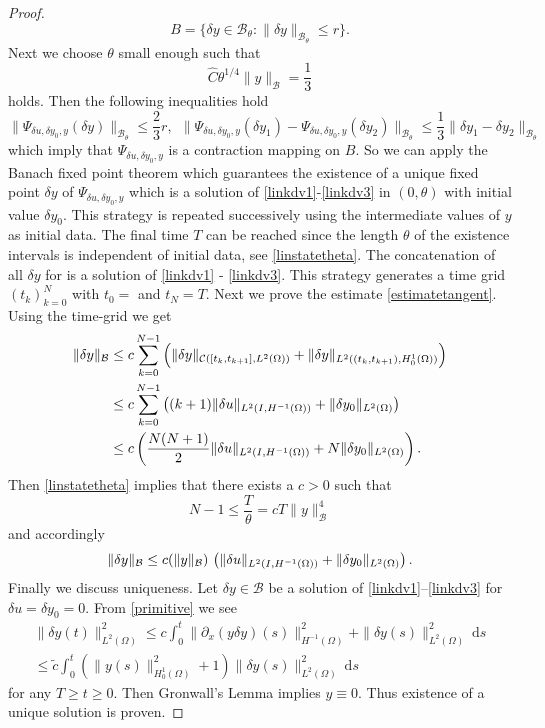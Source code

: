 \begin{proof}
\[
B=\{\delta y \in \mathcal B_{\theta}\colon \|\delta y\|_{\mathcal B_{\theta}}\leq r\}.
\]
{\color{red}
Next we choose $\theta$ small enough such that
\begin{equation}\label{linstatetheta}
\hat C\theta^{1/4}\|y\|_{\mathcal B}=\frac{1}{3}
\end{equation}
holds. Then the following inequalities hold
\[
\|\Psi_{\delta u, \delta y_0,y}(\delta y)\|_{\mathcal B_{\theta}}\leq \frac{2}{3}r,~~\|\Psi_{\delta u, \delta y_0,y}(\delta y_1) - \Psi_{\delta u, \delta y_0,y}(\delta y_2)\|_{\mathcal B_{\theta}}\leq\frac{1}{3}\|\delta y_1-\delta y_2\|_{\mathcal B_{\theta}}
\]
which imply that $\Psi_{\delta u, \delta y_0,y}$ is a contraction mapping on $B$. So we can apply the Banach fixed point theorem which guarantees the existence of a unique fixed point $\delta y$ of $\Psi_{\delta u, \delta y_0,y}$ which is a solution of \eqref{linkdv1}-\eqref{linkdv3} in $(0,\theta)$ with initial value $\delta y_0$. This strategy is repeated successively using the intermediate values of $y$ as initial data. The final time $T$ can be reached since the length $\theta$ of the existence intervals is independent of initial data, see \eqref{linstatetheta}. The concatenation of all $\delta y$ for is a solution of \eqref{linkdv1} - \eqref{linkdv3}. This strategy generates a time grid $(t_k)_{k=0}^N$ with $t_0=$ and $t_N=T$. Next we prove the estimate \eqref{estimatetangent}. Using the time-grid we get
\begin{align*}
\|\delta y\|_{\mathcal B}&\leq c\sum_{k=0}^{N-1}\left(\|\delta y\|_{\mathcal C([t_k,t_{k+1}],L^2(\Omega))}+\|\delta y\|_{L^2((t_k,t_{k+1}),H^1_0(\Omega))}\right)\\
&\leq c\sum_{k=0}^{N-1}\left((k+1)\|\delta u\|_{\Hm1}+\|\delta y_0\|_{L^2(\Omega)}\right)\\
&\leq c\left(\frac{N(N+1)}{2}\|\delta u\|_{\Hm1}+N\|\delta y_0\|_{L^2(\Omega)}\right).
\end{align*}
Then \eqref{linstatetheta} implies that there exists a $c>0$ such that
\[
N-1\leq\frac T\theta=cT\|y\|_{\mathcal B}^4
\]
and accordingly
\[
\|\delta y\|_{\mathcal B}\leq c(\|y\|_{\mathcal B})\,\left(\|\delta u\|_{\Hm1}+\|\delta y_0\|_{L^2(\Omega)}\right).
\]
}
{\color{blue}
Finally we discuss uniqueness. Let $\delta y\in \mathcal B$ be a solution of \eqref{linkdv1}--\eqref{linkdv3} for $\delta u=\delta y_0=0$. From \eqref{primitive} we see
\begin{multline*}
\|\delta y(t)\|_{L^2(\Omega)}^2\leq c\int_0^t\|\partial_x(y\delta y)(s)\|_{H^{-1}(\Omega)}^2+\|\delta y(s)\|^2_{L^2(\Omega)}~\mathrm ds\\
\leq \tilde c\int_0^t\left(\|y(s)\|_{H^1_0(\Omega)}^2+1\right)\|\delta y(s)\|_{L^2(\Omega)}^2~\mathrm ds
\end{multline*}
for any $T\geq t\geq 0$. Then Gronwall's Lemma implies $y\equiv0$. Thus existence of a unique solution is proven.}


\end{proof}
